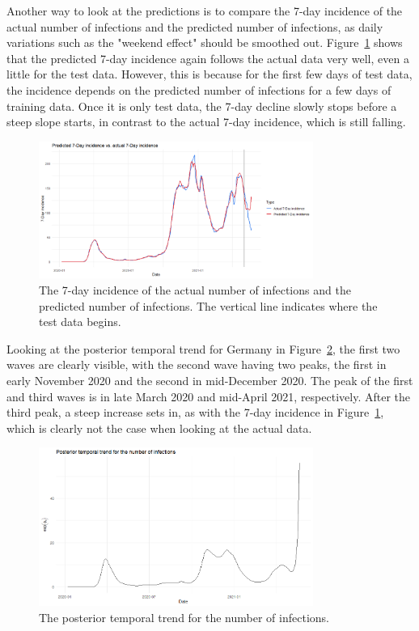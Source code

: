 Another way to look at the predictions is to compare the 7-day incidence of the actual number of infections and the predicted number of infections, as daily variations such as the "weekend effect" should be smoothed out. Figure~\ref{incidence_germany} shows that the predicted 7-day incidence again follows the actual data very well, even a little for the test data. However, this is because for the first few days of test data, the incidence depends on the predicted number of infections for a few days of training data. Once it is only test data, the 7-day decline slowly stops before a steep slope starts, in contrast to the actual 7-day incidence, which is still falling.
\begin{figure}[H]
  \centering
  \includegraphics[width = 0.8\textwidth]{incidence_germany.png}  
  \caption{The 7-day incidence of the actual number of infections and the predicted number of infections. The vertical line indicates where the test data begins.}
  \label{incidence_germany}
\end{figure}
Looking at the posterior temporal trend for Germany in Figure~\ref{trend_germany}, the first two waves are clearly visible, with the second wave having two peaks, the first in early November 2020 and the second in mid-December 2020. The peak of the first and third waves is in late March 2020 and mid-April 2021, respectively. After the third peak, a steep increase sets in, as with the 7-day incidence in Figure~\ref{incidence_germany}, which is clearly not the case when looking at the actual data.
\begin{figure}[H]
  \centering
  \includegraphics[width = 0.8\textwidth]{temp_trend_germany.png}  
  \caption{The posterior temporal trend for the number of infections.}
  \label{trend_germany}
\end{figure}
